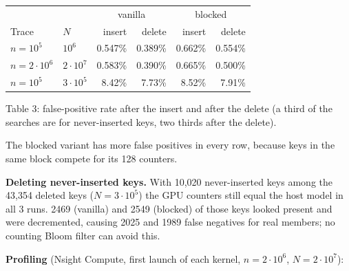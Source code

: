 \documentclass[11pt]{article}
\begin{document}
\begin{center}
\begin{tabular}{llrrrr}
\toprule
 & & \multicolumn{2}{c}{vanilla} & \multicolumn{2}{c}{blocked} \\
Trace & $N$ & insert & delete & insert & delete \\
\midrule
$n=10^5$       & $10^6$        & 0.547\% & 0.389\% & 0.662\% & 0.554\% \\
$n=2\cdot10^6$ & $2\cdot10^7$  & 0.583\% & 0.390\% & 0.665\% & 0.500\% \\
$n=10^5$       & $3\cdot10^5$  & 8.42\%  & 7.73\%  & 8.52\%  & 7.91\% \\
\bottomrule
\end{tabular}

\smallskip
{\small Table 3: false-positive rate after the insert and after the delete (a third of the searches are for never-inserted keys, two thirds after the delete).}
\end{center}

The blocked variant has more false positives in every row, because keys in the
same block compete for its 128 counters.

\textbf{Deleting never-inserted keys.} With 10,020 never-inserted keys among the
43,354 deleted keys ($N=3\cdot10^5$) the GPU counters still equal the host model
in all 3 runs. 2469 (vanilla) and 2549 (blocked) of those keys looked present
and were decremented, causing 2025 and 1989 false negatives for real members;
no counting Bloom filter can avoid this.

\textbf{Profiling} (Nsight Compute, first launch of each kernel, $n=2\cdot10^6$,
$N=2\cdot10^7$):
\end{document}
